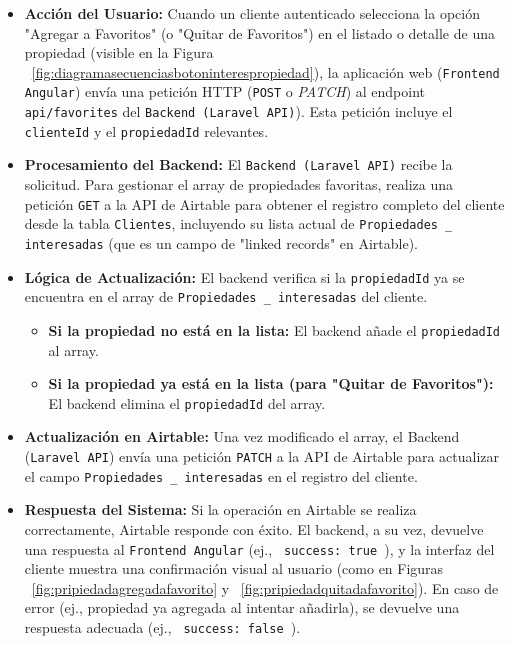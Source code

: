 \begin{itemize}
    \item \textbf{Acción del Usuario:} Cuando un cliente autenticado selecciona la opción "Agregar a Favoritos" (o "Quitar de Favoritos") en el listado o detalle de una propiedad (visible en la Figura ~\ref{fig:diagramasecuenciasbotoninterespropiedad}), la aplicación web (\texttt{Frontend Angular}) envía una petición HTTP (\texttt{POST} o \textit{PATCH}) al endpoint \texttt{api/favorites} del \texttt{Backend (Laravel API)}). Esta petición incluye el \texttt{clienteId} y el \texttt{propiedadId} relevantes.

    \item \textbf{Procesamiento del Backend:} El \texttt{Backend (Laravel API)} recibe la solicitud. Para gestionar el array de propiedades favoritas, realiza una petición \texttt{GET} a la API de Airtable para obtener el registro completo del cliente desde la tabla \texttt{Clientes}, incluyendo su lista actual de \texttt{Propiedades \_ interesadas} (que es un campo de "linked records" en Airtable).

    \item \textbf{Lógica de Actualización:} El backend verifica si la \texttt{propiedadId} ya se encuentra en el array de \texttt{Propiedades \_ interesadas} del cliente.
    \begin{itemize}
        \item \textbf{Si la propiedad no está en la lista:} El backend añade el \texttt{propiedadId} al array.
        \item \textbf{Si la propiedad ya está en la lista (para "Quitar de Favoritos"):} El backend elimina el \texttt{propiedadId} del array.
    \end{itemize}

    \item \textbf{Actualización en Airtable:} Una vez modificado el array, el Backend (\texttt{Laravel API}) envía una petición \texttt{PATCH} a la API de Airtable para actualizar el campo \texttt{Propiedades \_ interesadas} en el registro del cliente.

    \item \textbf{Respuesta del Sistema:} Si la operación en Airtable se realiza correctamente, Airtable responde con éxito. El backend, a su vez, devuelve una respuesta al \texttt{Frontend Angular} (ej., \texttt{{ success: true }}), y la interfaz del cliente muestra una confirmación visual al usuario (como en Figuras ~\ref{fig:pripiedadagregadafavorito} y ~\ref{fig:pripiedadquitadafavorito}). En caso de error (ej., propiedad ya agregada al intentar añadirla), se devuelve una respuesta adecuada (ej., \texttt{{ success: false }}).
\end{itemize}

